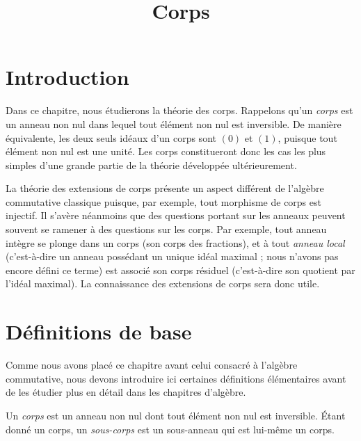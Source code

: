 

%


\title{Corps}


\maketitle

\label{section-phantom}

\tableofcontents


\section{Introduction}
\label{section-introduction}

\noindent
Dans ce chapitre, nous étudierons la théorie des corps. Rappelons qu'un
{\it corps} est un anneau non nul dans lequel tout élément non nul est inversible.
De manière équivalente, les deux seuls idéaux d'un corps sont $(0)$ et $(1)$,
puisque tout élément non nul est une unité. Les corps constitueront donc les
cas les plus simples d'une grande partie de la théorie développée ultérieurement.

\medskip\noindent
La théorie des extensions de corps présente un aspect différent de l'algèbre
commutative classique puisque, par exemple, tout morphisme de corps est injectif.
Il s'avère néanmoins que des questions portant sur les anneaux peuvent souvent
se ramener à des questions sur les corps. Par exemple, tout anneau intègre se plonge dans un corps
(son corps des fractions), et à tout {\it anneau local} (c'est-à-dire un anneau possédant un unique
idéal maximal ; nous n'avons pas encore défini ce terme) est associé son
corps résiduel (c'est-à-dire son quotient par l'idéal maximal).
La connaissance des extensions de corps sera donc utile.




\section{Définitions de base}
\label{section-definitions}

\noindent
Comme nous avons placé ce chapitre avant celui consacré à l'algèbre
commutative, nous devons introduire ici certaines définitions élémentaires
avant de les étudier plus en détail dans les chapitres d'algèbre.

\begin{definition}
\label{definition-field}
Un {\it corps} est un anneau non nul dont tout élément non nul est inversible.
Étant donné un corps, un {\it sous-corps} est un sous-anneau qui est lui-même un corps.
\end{definition}

